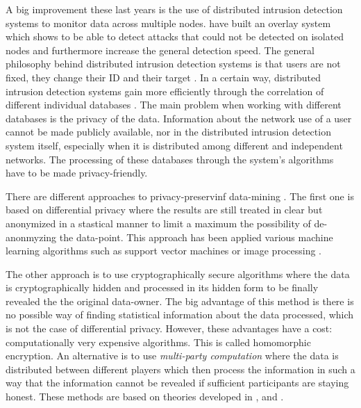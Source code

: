 A big improvement these last years is the use of distributed intrusion detection systems to monitor data across multiple nodes. \cite{Yegneswaran2004GlobalSystem} have built an overlay system which shows to be able to detect attacks that could not be detected on isolated nodes and furthermore increase the general detection speed. The general philosophy behind distributed intrusion detection systems is that users are not fixed, they change their ID and their target \cite{Snapp1991DIDSPrototype}. In a certain way, distributed intrusion detection systems gain more efficiently through the correlation of different individual databases \cite{RoyceRobbins2004DistributedReview}. The main problem when working with different databases is the privacy of the data. Information about the network use of a user cannot be made publicly available, nor in the distributed intrusion detection system itself, especially when it is distributed among different and independent networks. The processing of these databases through the system's algorithms have to be made privacy-friendly.

There are different approaches to privacy-preservinf data-mining \cite{Narwaria2016PrivacyArt}. The first one is based on differential privacy \cite{Dwork2008DifferentialResults} where the results are still treated in clear but anonymized in a stastical manner to limit a maximum the possibility of de-anonmyzing the data-point. This approach has been applied various machine learning algorithms such as support vector machines \cite{Zhan2005Privacy-preservingLearning} or image processing \cite{Qin2018Privacy-PreservingCloud}.

The other approach is to use cryptographically secure algorithms where the data is cryptographically hidden and processed in its hidden form to be finally revealed the the original data-owner. The big advantage of this method is there is no possible way of finding statistical information about the data processed, which is not the case of differential privacy. However, these advantages have a cost: computationally very expensive algorithms. This is called homomorphic encryption. An alternative is to use \emph{multi-party computation} where the data is distributed between different players which then process the information in such a way that the information cannot be revealed if sufficient participants are staying honest. These methods are based on theories developed in \cite{Yao1986HowSecrets}, \cite{Rabin1981HowTransfer.} and \cite{Shamir1979HowSecret}.

